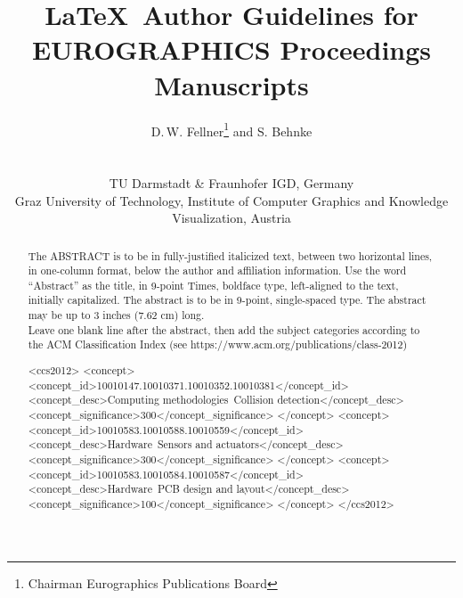


\title[EG \LaTeX\ Author Guidelines]{\LaTeX\ Author Guidelines for EUROGRAPHICS Proceedings Manuscripts}

\author[D. Fellner \& S. Behnke]
{\parbox{\textwidth}{\centering D.\,W. Fellner\thanks{Chairman Eurographics Publications Board}
        and S. Behnke 
}
        \\
{\parbox{\textwidth}{\centering TU Darmstadt \& Fraunhofer IGD, Germany\\
         Graz University of Technology, Institute of Computer Graphics and Knowledge Visualization, Austria
}
}
}









\maketitle
\begin{abstract}
   The ABSTRACT is to be in fully-justified italicized text, 
   between two horizontal lines,
   in one-column format, 
   below the author and affiliation information. 
   Use the word ``Abstract'' as the title, in 9-point Times, boldface type, 
   left-aligned to the text, initially capitalized. 
   The abstract is to be in 9-point, single-spaced type.
   The abstract may be up to 3 inches (7.62 cm) long. \\
   Leave one blank line after the abstract, 
   then add the subject categories according to the ACM Classification Index 
(see https://www.acm.org/publications/class-2012)
\begin{CCSXML}
<ccs2012>
<concept>
<concept_id>10010147.10010371.10010352.10010381</concept_id>
<concept_desc>Computing methodologies~Collision detection</concept_desc>
<concept_significance>300</concept_significance>
</concept>
<concept>
<concept_id>10010583.10010588.10010559</concept_id>
<concept_desc>Hardware~Sensors and actuators</concept_desc>
<concept_significance>300</concept_significance>
</concept>
<concept>
<concept_id>10010583.10010584.10010587</concept_id>
<concept_desc>Hardware~PCB design and layout</concept_desc>
<concept_significance>100</concept_significance>
</concept>
</ccs2012>
\end{CCSXML}



\printccsdesc   
\end{abstract}  
